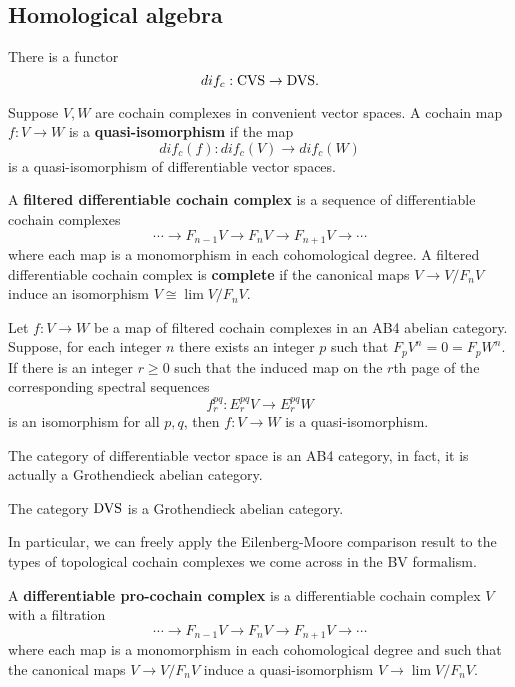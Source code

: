 \documentclass[10pt, oneside]{article}
\begin{document}
\subsection{Homological algebra}


There is a functor
\[
dif_c : {\rm CVS} \to {\rm DVS} .
\]

\begin{dfn}
Suppose $V,W$ are cochain complexes in convenient vector spaces. 
A cochain map $f : V \to W$ is a {\bf quasi-isomorphism} if the map
\[
dif_c (f) : dif_c(V) \to dif_c(W)
\]
is a quasi-isomorphism of differentiable vector spaces.
\end{dfn}

\begin{dfn}
A {\bf filtered differentiable cochain complex} is a sequence of differentiable cochain complexes
\[
\cdots \to F_{n-1} V \to F_{n} V \to F_{n+1}V \to \cdots
\]
where each map is a monomorphism in each cohomological degree. 
A filtered differentiable cochain complex is {\bf complete} if the canonical maps $V \to V / F_n V$ induce an isomorphism $V \cong \lim V / F_n V$. 
\end{dfn}

\begin{thm}
Let $f : V \to W$ be a map of filtered cochain complexes in an AB4 abelian category.
Suppose, for each integer $n$ there exists an integer $p$ such that $F_p V^n = 0 = F_p W^n$.
If there is an integer $r \geq 0$ such that the induced map on the $r$th page of the corresponding spectral sequences 
\[
f_r^{pq} :  E_r^{pq} V \to E_r^{pq} W
\]
is an isomorphism for all $p,q$, then $f : V \to W$ is a quasi-isomorphism. 
\end{thm}

The category of differentiable vector space is an AB4 category, in fact, it is actually a Grothendieck abelian category. 

\begin{thm}
The category ${\rm DVS}$ is a Grothendieck abelian category.
\end{thm}

In particular, we can freely apply the Eilenberg-Moore comparison result to the types of topological cochain complexes we come across in the BV formalism. 

\begin{dfn}\label{dfn: pro}
A {\bf differentiable pro-cochain complex} is a differentiable cochain complex $V$ with a filtration
\[
\cdots \to F_{n-1} V \to F_{n} V \to F_{n+1}V \to \cdots
\]
where each map is a monomorphism in each cohomological degree and such that the canonical maps $V \to V / F_n V$ induce a quasi-isomorphism $V \to \lim V / F_n V$. 
\end{dfn}
\end{document}
